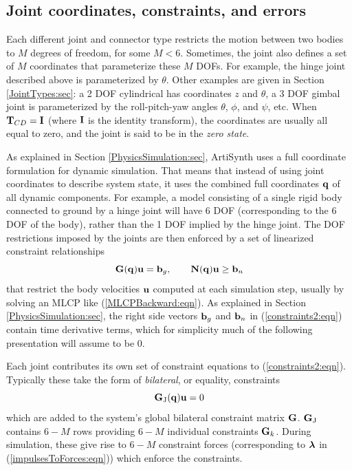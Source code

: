 \subsection{Joint coordinates, constraints, and errors}
\label{JointCoordinates:sec}

Each different joint and connector type restricts the motion between
two bodies to $M$ degrees of freedom, for some $M < 6$.  Sometimes,
the joint also defines a set of $M$ coordinates that parameterize
these $M$ DOFs. For example, the hinge joint described above is
parameterized by $\theta$. Other examples are given in
Section \ref{JointTypes:sec}: a 2 DOF cylindrical has coordinates $z$
and $\theta$, a 3 DOF gimbal joint is parameterized by the
roll-pitch-yaw angles $\theta$, $\phi$, and $\psi$, etc.  When
${\bf T}_{CD} = {\bf I}$ (where ${\bf I}$ is the identity transform), the coordinates
are usually all equal to zero, and the joint is said to be in the {\it
zero state}.

As explained in Section \ref{PhysicsSimulation:sec}, ArtiSynth uses a
full coordinate formulation for dynamic simulation. That means that
instead of using joint coordinates to describe system state, it uses
the combined full coordinates ${\bf q}$ of all dynamic components. For
example, a model consisting of a single rigid body connected to ground
by a hinge joint will have 6 DOF (corresponding to the 6 DOF of the
body), rather than the 1 DOF implied by the hinge joint.  The DOF
restrictions imposed by the joints are then enforced by a set of
linearized constraint relationships
%
\begin{equation}
{\bf G}({\bf q}) {\bf u} = {\bf b}_g, \qquad {\bf N}({\bf q}) {\bf u} \ge {\bf b}_n
\label{constraints2:eqn}
\end{equation}
%
that restrict the body velocities ${\bf u}$ computed at each simulation
step, usually by solving an MLCP like (\ref{MLCPBackward:eqn}). As
explained in Section \ref{PhysicsSimulation:sec}, the right side
vectors ${\bf b}_g$ and ${\bf b}_n$ in (\ref{constraints2:eqn}) contain time
derivative terms, which for simplicity much of the following
presentation will assume to be 0.

Each joint contributes its own set of constraint equations to
(\ref{constraints2:eqn}). Typically these take the form of {\it
bilateral}, or equality, constraints
%
\begin{equation}
{\bf G}_\text{J}({\bf q}) {\bf u} = 0
\label{bilateralG:eqn}
\end{equation}
%
which are added to the system's global bilateral constraint matrix
${\bf G}$. ${\bf G}_\text{J}$ contains $6 - M$ rows providing $6 - M$ individual
constraints ${\bf G}_k$.
During simulation, these give rise to $6 - M$ constraint
forces (corresponding to $\boldsymbol\lambda$ in (\ref{impulsesToForces:eqn}))
which enforce the constraints.

